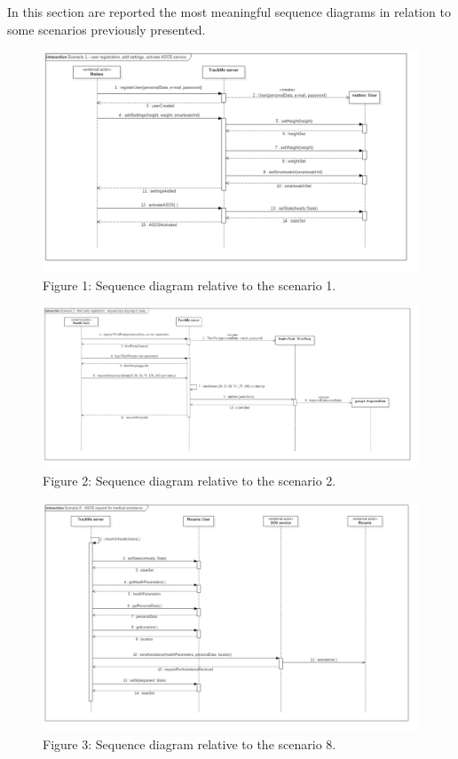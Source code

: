 In this section are reported the most meaningful sequence diagrams in relation to some scenarios previously presented.

\begin{figure}[!h]
	\includegraphics[width=1.00\textwidth]{./pictures/Scenario_1.png}\par
	\caption{Figure 1: Sequence diagram relative to the scenario 1.}
\end{figure}
\FloatBarrier
\vspace{0.3cm}

\begin{figure}[!h]
	\includegraphics[width=1.00\textwidth]{./pictures/Scenario_2.png}\par
	\caption{Figure 2: Sequence diagram relative to the scenario 2.}
\end{figure}
\FloatBarrier
\vspace{0.3cm}

\begin{figure}[!h]
	\includegraphics[width=1.00\textwidth]{./pictures/Scenario_8.png}\par
	\caption{Figure 3: Sequence diagram relative to the scenario 8.}
\end{figure}
\FloatBarrier
\vspace{0.3cm}
